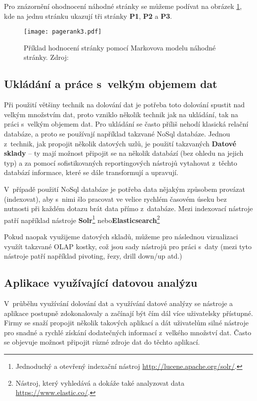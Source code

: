 \par Pro znázornění ohodnocení náhodné stránky se můžeme podívat na obrázek \ref{pageRankFig}, kde na jednu stránku ukazují tři stránky \textbf{P1}, \textbf{P2} a \textbf{P3}.
\begin{figure}[htp]
\centering
\texttt{[image: pagerank3.pdf]}
\caption[Příklad hodnocení stránky pomocí Markovova modelu náhodné stránky]{Příklad hodnocení stránky pomocí Markovova modelu náhodné stránky. Zdroj: \cite{minigbook}}
\label{pageRankFig}
\end{figure}

\subsection{Ukládání a práce s~velkým objemem dat}
\par Při použití většiny technik na dolování dat je potřeba toto dolování spustit nad velkým množstvím dat, proto vzniklo několik technik jak na ukládání, tak na práci s~velkým objemem dat. Pro ukládání se často příliš nehodí klasická relační databáze, a proto se používají například takzvané NoSql databáze. Jednou z~technik, jak propojit několik datových uzlů, je použití takzvaných \textbf{Datové sklady} -- ty mají možnost připojit se na několik databází (bez ohledu na jejich typ) a za pomocí sofistikovaných reportingových nástrojů vytahovat z~těchto databází informace, které se dále transformují a upravují. \cite{nosql}

\par V~případě použití NoSql databáze je potřeba data nějakým způsobem provázat (indexovat), aby s~nimi šlo pracovat ve velice rychlém časovém úseku bez nutnosti při každém dotazu brát data přímo z~databáze. Mezi indexovací nástroje patří například nástroje \textbf{Solr}\footnote{Jednoduchý a otevřený indexační nástroj \url{http://lucene.apache.org/solr/}.} nebo\textbf{Elasticsearch}\footnote{Nástroj, který vyhledává a dokáže také analyzovat data \url{https://www.elastic.co/}.}

\par Pokud naopak využijeme datových skladů, můžeme pro následnou vizualizaci využít takzvané OLAP kostky, což jsou sady nástrojů pro práci s~daty (mezi tyto nástroje patří například pivoting, řezy, drill down/up atd.)

\subsection{Aplikace využívající datovou analýzu}
\par V~průběhu využívání dolování dat a využívání datové analýzy se nástroje a aplikace postupně zdokonalovaly a začínají být čím dál více uživatelsky přístupné. Firmy se snaží propojit několik takových aplikací a dát uživatelům silné nástroje pro snadné a rychlé získání dodatečných informací z~velkého množství dat. Často se objevuje možnost připojit různé zdroje dat do těchto aplikací.

